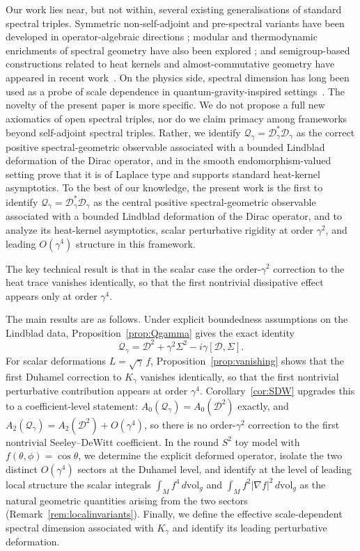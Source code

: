 \documentclass[11pt,a4paper]{article}
\numberwithin{equation}{section}
\theoremstyle{definition}
\newcommand{\cD}{\mathcal{D}}
\newcommand{\Qg}{\mathcal{Q}_\gamma}
\newcommand{\Dg}{\mathcal{D}_\gamma}
\newcommand{\Sig}{\Sigma}
\begin{document}
Our work lies near, but not within, several existing generalisations of
standard spectral triples. Symmetric non-self-adjoint and pre-spectral
variants have been developed in operator-algebraic directions
\cite{ConnesLevitinaEtAl2019,LiWang2025}; modular and thermodynamic
enrichments of spectral geometry have also been explored
\cite{BertozziniContiLewkeeratiyutkul2010}; and semigroup-based
constructions related to heat kernels and almost-commutative geometry
have appeared in recent work~\cite{Gakkhar2022,Gakkhar2024}. On the
physics side, spectral dimension has long been used as a probe of scale
dependence in quantum-gravity-inspired
settings~\cite{AmbjornJurkiewiczLoll2005,AlkoferSaueressigZanusso2015}.
The novelty of the present paper is more specific. We do not propose a
full new axiomatics of open spectral triples, nor do we claim primacy
among frameworks beyond self-adjoint spectral triples. Rather, we
identify $\Qg=\Dg^*\Dg$ as the correct positive spectral-geometric
observable associated with a bounded Lindblad deformation of the Dirac
operator, and in the smooth endomorphism-valued setting prove that it is of
Laplace type and supports standard heat-kernel asymptotics. To the best
of our knowledge, the present work is the first to identify
$\Qg=\Dg^*\Dg$ as the central positive spectral-geometric observable
associated with a bounded Lindblad deformation of the Dirac operator,
and to analyze its heat-kernel asymptotics, scalar perturbative rigidity
at order $\gamma^2$, and leading $O(\gamma^4)$ structure in this
framework.

The key technical result is that in the scalar case the order-$\gamma^2$
correction to the heat trace vanishes identically, so that the first
nontrivial dissipative effect appears only at order $\gamma^4$.

The main results are as follows. Under explicit boundedness assumptions
on the Lindblad data, Proposition~\ref{prop:Qgamma} gives the exact
identity
\begin{equation}
\Qg=\cD^2+\gamma^2\Sig^2-i\gamma[\cD,\Sig].
\end{equation}
For scalar deformations $L=\sqrt\gamma\,f$,
Proposition~\ref{prop:vanishing} shows that the first Duhamel correction
to $K_\gamma$ vanishes identically, so that the first nontrivial
perturbative contribution appears at order $\gamma^4$.
Corollary~\ref{cor:SDW} upgrades this to a coefficient-level statement:
$A_0(\Qg)=A_0(\cD^2)$ exactly, and $A_2(\Qg)=A_2(\cD^2)+O(\gamma^4)$,
so there is no order-$\gamma^2$ correction to the first nontrivial
Seeley--DeWitt coefficient. In the round $S^2$
toy model with $f(\theta,\phi)=\cos\theta$, we determine the explicit
deformed operator, isolate the two distinct $O(\gamma^4)$ sectors at
the Duhamel level, and identify at the level of leading local structure
the scalar integrals $\int_M f^4\,d\mathrm{vol}_g$ and
$\int_M f^2|\nabla f|^2\,d\mathrm{vol}_g$ as the natural geometric
quantities arising from the two sectors (Remark~\ref{rem:localinvariants}).
Finally, we define the effective scale-dependent
spectral dimension associated with $K_\gamma$ and identify its leading
perturbative deformation.
\end{document}
